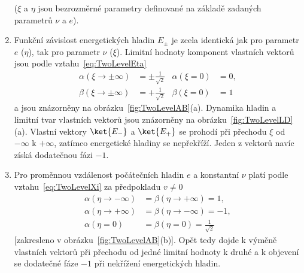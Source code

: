 \begin{solution}
\begin{enumerate}
\begin{subequations}
        \end{subequations}
		($\xi$ a $\eta$ jsou bezrozměrné parametry definované na základě zadaných parametrů $\nu$ a $e$).
		
	\item 
		Funkční závislost energetických hladin $E_{\pm}$ je zcela identická jak pro parametr $e$ ($\eta$), tak pro parametr $\nu$ ($\xi$).
        Limitní hodnoty komponent vlastních vektorů jsou podle vztahu~\eqref{eq:TwoLevelEta}
        \begin{subequations}
            \begin{align}
                \alpha(\xi\rightarrow\pm\infty)
                    &=\pm\frac{1}{\sqrt{2}} & \alpha(\xi=0)&=0, \\
                \beta(\xi\rightarrow\pm\infty)
                    &=+\frac{1}{\sqrt{2}} & \beta(\xi=0)&=1
            \end{align}
        \end{subequations}
		a jsou znázorněny na obrázku~\ref{fig:TwoLevelAB}(a).
		Dynamika hladin a limitní tvar vlastních vektorů jsou znázorněny na obrázku~\ref{fig:TwoLevelLD}(a).
		Vlastní vektory $\ket{E_{-}}$ a $\ket{E_{+}}$ se prohodí při přechodu $\xi$ od $-\infty$ k $+\infty$, 
		zatímco energetické hladiny se nepřekříží.
		Jeden z vektorů navíc získá dodatečnou fázi $-1$.
		
	\item 
        Pro proměnnou vzdálenost počátečních hladin $e$ a konstantní $\nu$ platí podle vztahu~\eqref{eq:TwoLevelXi} za předpokladu $v\neq0$
        \begin{subequations}
            \begin{align}
                \alpha(\eta\rightarrow-\infty)
                    &=\beta(\eta\rightarrow+\infty)=1, \\
                \alpha(\eta\rightarrow+\infty)
                    &=\beta(\eta\rightarrow-\infty)=-1, \\
                \alpha(\eta=0)
                    &=\beta(\eta=0)
                    =\frac{1}{\sqrt{2}}
            \end{align}
        \end{subequations}
		[zakresleno v obrázku~\ref{fig:TwoLevelAB}(b)].
		Opět tedy dojde k výměně vlastních vektorů při přechodu od jedné limitní hodnoty k druhé a k objevení se dodatečné fáze $-1$ při nekřížení energetických hladin.
		

\end{enumerate}
\end{solution}
